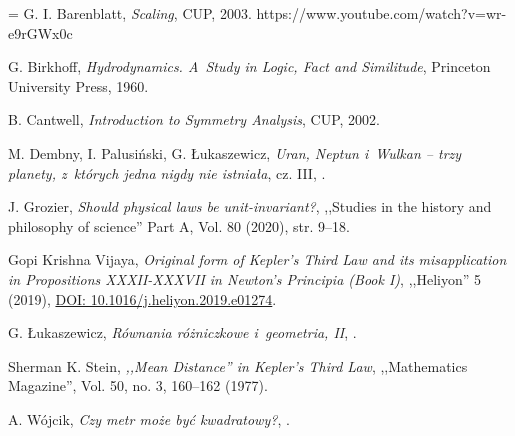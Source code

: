 \begin{dwieszpalty}
{\small\parskip0pt\everypar={ }
G. I. Barenblatt, {\it Scaling}, CUP, 2003. https://www.youtube.com/watch?v=wr-e9rGWx0c

G. Birkhoff, {\it Hydrodynamics. A~Study in Logic, Fact and Similitude}, Princeton University Press, 1960.

B. Cantwell, {\it Introduction to Symmetry Analysis}, CUP, 2002.

M. Dembny, I. Palusiński, G. Łukaszewicz, {\it Uran, Neptun i~Wulkan -- trzy planety, z~których jedna nigdy nie istniała}, cz. III, .

J. Grozier, {\it Should physical laws be unit-invariant?}, ,,Studies in the history and philosophy of science'' Part A, Vol. 80 (2020), str. 9--18. 

Gopi Krishna Vijaya, {\it Original form of Kepler's Third Law and its misapplication in Propositions XXXII-XXXVII in Newton's Principia (Book I)}, ,,Heliyon'' 5 (2019), 
\href{https://doi.org/10.1016/j.heliyon.2019.e01274}{DOI: 10.1016/j.heliyon.2019.e01274}.

G. Łukaszewicz, {\it Równania różniczkowe i~geometria, II}, .

Sherman K. Stein, {\it ,,Mean Distance'' in Kepler's Third Law}, ,,Mathematics Magazine'', Vol. 50, no. 3, 160--162 (1977).

A. Wójcik, {\it Czy metr może być kwadratowy?}, .

}
\end{dwieszpalty}

